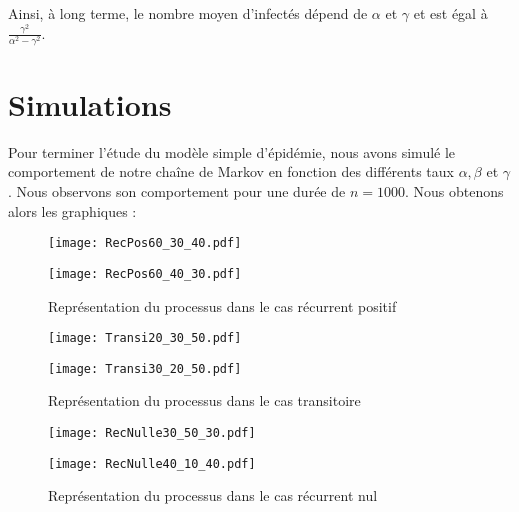 \documentclass[12pt,a4paper]{report}
\theoremstyle{remark}
\begin{document}
Ainsi, à long terme, le nombre moyen d'infectés dépend de $\alpha$ et $\gamma$ et est égal à $\frac{\gamma^2}{\alpha^2-\gamma^2}$.

\section{Simulations}
\vspace{0.6cm}

Pour terminer l'étude du modèle simple d'épidémie, nous avons simulé le comportement de notre chaîne de Markov en fonction des différents taux $\alpha, \beta$ et $ \gamma$. Nous observons son comportement pour une durée de $n=1000$. Nous obtenons alors les graphiques : \\
\begin{figure}[h!]
    \begin{minipage}[c]{0.25\linewidth}
        \centering
        \texttt{[image: RecPos60\_30\_40.pdf]}
    \end{minipage}
    \hfill%
    \vspace{0.1cm}
    \begin{minipage}[c]{0.50\linewidth}
        \centering
        \texttt{[image: RecPos60\_40\_30.pdf]}  
    \end{minipage}
    \caption{Représentation du processus dans le cas récurrent positif}
    \label{fig_rec_positif}
\end{figure}

\begin{figure}[h!]
    \begin{minipage}[c]{0.25\linewidth}
        \centering
        \texttt{[image: Transi20\_30\_50.pdf]}
    \end{minipage}
    \hfill%
    \vspace{0.1cm}
    \begin{minipage}[c]{0.50\linewidth}
        \centering
        \texttt{[image: Transi30\_20\_50.pdf]}
    \end{minipage}
      \caption{Représentation du processus dans le cas transitoire}
      \label{fig_transitoire}
\end{figure}

\begin{figure}[h!]
    \begin{minipage}[c]{0.25\linewidth}
        \centering
        \texttt{[image: RecNulle30\_50\_30.pdf]}
    \end{minipage}
    \hfill%
    \vspace{0.1cm}
    \begin{minipage}[c]{0.50\linewidth}
        \centering
        \texttt{[image: RecNulle40\_10\_40.pdf]}
    \end{minipage}
      \caption{Représentation du processus dans le cas récurrent nul}
      \label{fig_rec_nul}
\end{figure}
 
\end{document}
